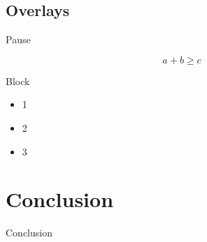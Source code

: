 \documentclass{beamer}
\begin{document}
  \subsection{Overlays}

  \begin{frame}{Pause}
    \begin{example}
      \begin{equation}
        a + b \geq c
      \end{equation}
    \end{example}
    \pause
    \begin{block}{Block}
      \begin{itemize}
        \item 1
          \pause
        \item 2
        \item 3
      \end{itemize}
    \end{block}
  \end{frame}

\section{Conclusion}

\begin{frame}{Conclusion}
\end{frame}
\end{document}
